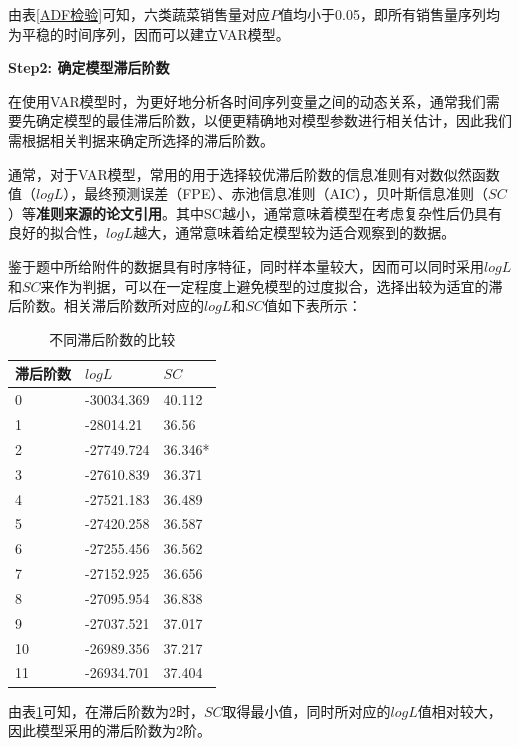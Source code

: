 \documentclass{my_paper}
\begin{document}
\begin{itemize}
由表\ref{ADF检验}可知，六类蔬菜销售量对应$P$值均小于0.05，即所有销售量序列均为平稳的时间序列，因而可以建立VAR模型。\par
\vspace{0.5cm}
\textbf{Step2: 确定模型滞后阶数}\par
在使用VAR模型时，为更好地分析各时间序列变量之间的动态关系，通常我们需要先确定模型的最佳滞后阶数，以便更精确地对模型参数进行相关估计，因此我们需根据相关判据来确定所选择的滞后阶数。\par
通常，对于VAR模型，常用的用于选择较优滞后阶数的信息准则有对数似然函数值（$logL$），最终预测误差（FPE）、赤池信息准则（AIC），贝叶斯信息准则（$SC$）等\textbf{准则来源的论文引用}。其中SC越小，通常意味着模型在考虑复杂性后仍具有良好的拟合性，$logL$越大，通常意味着给定模型较为适合观察到的数据。\par
鉴于题中所给附件的数据具有时序特征，同时样本量较大，因而可以同时采用$logL$和$SC$来作为判据，可以在一定程度上避免模型的过度拟合，选择出较为适宜的滞后阶数。相关滞后阶数所对应的$logL$和$SC$值如下表所示：
\begin{table}[H]
    \centering
    \caption{不同滞后阶数的比较}
    \begin{tabular}{p{2.0cm}<{\centering}p{4.0cm}<{\centering}p{2.0cm}<{\centering}}
    \toprule
        滞后阶数 & $logL$ & $SC$ \\ 
        \midrule
        0 & -30034.369 & 40.112 \\ 
        1 & -28014.21 & 36.56 \\ 
        2 & -27749.724 & 36.346* \\ 
        3 & -27610.839 & 36.371 \\ 
        4 & -27521.183 & 36.489 \\ 
        5 & -27420.258 & 36.587 \\ 
        6 & -27255.456 & 36.562 \\ 
        7 & -27152.925 & 36.656 \\ 
        8 & -27095.954 & 36.838 \\ 
        9 & -27037.521 & 37.017 \\ 
        10 & -26989.356 & 37.217 \\ 
        11 & -26934.701 & 37.404 \\ 
        \bottomrule
    \end{tabular}
    \label{不同滞后阶数的比较}
\end{table}
由表\ref{不同滞后阶数的比较}可知，在滞后阶数为2时，$SC$取得最小值，同时所对应的$logL$值相对较大，因此模型采用的滞后阶数为2阶。\par

\end{itemize}
\end{document}
